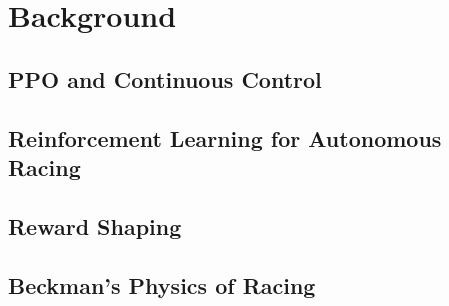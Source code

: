 \section{Background}
\label{sec:background}


\subsection{PPO and Continuous Control}

\subsection{Reinforcement Learning for Autonomous Racing}

\subsection{Reward Shaping}

\subsection{Beckman's Physics of Racing}

